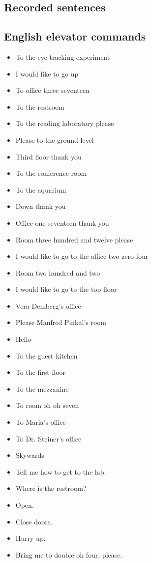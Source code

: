 \documentclass[a4paper, 12pt]{article}
\begin{document}
\begin{appendix}
\section{Recorded sentences} \label{prompts}
\subsection{English elevator commands}
\begin{itemize}
\item To the eye-tracking experiment
\item I would like to go up
\item To office three seventeen
\item To the restroom
\item To the reading laboratory please
\item Please to the ground level 
\item Third floor thank you
\item To the conference room
\item To the aquarium
\item Down thank you
\item Office one seventeen thank you
\item Room three hundred and twelve please
\item I would like to go to the office two zero four
\item Room two hundred and two 
\item I would like to go to the top floor
\item Vera Demberg's office
\item Please Manfred Pinkal's room
\item Hello 
\item To the guest kitchen
\item To the first floor
\item To the mezzanine
\item To room oh oh seven
\item To Maria's office
\item To Dr. Steiner's office
\item Skywards
\item Tell me how to get to the lab.
\item Where is the restroom?
\item Open.
\item Close doors.
\item Hurry up.
\item Bring me to double oh four, please.

\end{itemize}
\end{appendix}
\end{document}
